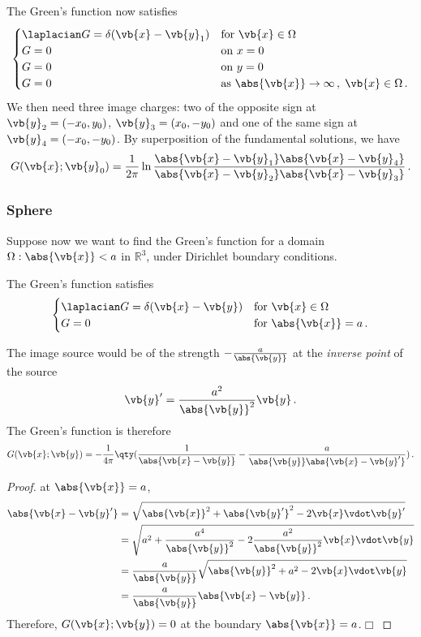 \documentclass{article}
\theoremstyle{plain}\theoremheaderfont{\normalfont\itshape}\theorembodyfont{\rmfamily}\theoremseparator{.}\newtheorem*{rem}{Remark}\newtheorem*{ex}{Example}\newtheorem*{proof}{Proof}\newtheorem*{altp}{Alternative proof}
\theoremstyle{plain}\theoremheaderfont{\normalfont\bfseries}\theorembodyfont{\rmfamily}\theoremseparator{.}\newtheorem{thm}{Theorem}[section]\newtheorem{lem}[thm]{Lemma}\newtheorem{prop}[thm]{Proposition}\newtheorem*{cor}{Corollary}\newtheorem{defn}[thm]{Definition}\newtheorem{clm}[thm]{Claim}\newtheorem{clminproof}{Claim}
\theoremstyle{break}\theoremheaderfont{\normalfont\itshape}\theorembodyfont{\rmfamily}\theoremseparator{.\medskip}\newtheorem*{proofskip}{Proof}\newtheorem*{exs}{Examples}\newtheorem*{rems}{Remarks}
\theoremstyle{break}\theoremheaderfont{\normalfont\bfseries}\theorembodyfont{\rmfamily}\theoremseparator{.\medskip}\newtheorem{lemskip}[thm]{Lemma}\newtheorem{defnskip}[thm]{Definition}\newtheorem{propskip}[thm]{Proposition}\newtheorem{thmskip}[thm]{Theorem}
\numberwithin{equation}{section}
\newcommand{\qed}{\hfill\ensuremath{\Box}}
\begin{document}
	The Green's function now satisfies
	\[\begin{cases}
		\laplacian G=\delta(\vb{x}-\vb{y}_1) & \text{for }\vb{x}\in\Omega\\
		G=0 & \text{on }x=0\\
		G=0 & \text{on }y=0\\
		G=0 & \text{as }\abs{\vb{x}}\to\infty\,,\;\vb{x}\in\Omega\,.
	\end{cases}\]
	We then need three image charges: two of the opposite sign at \(\vb{y}_2=(-x_0,y_0)\), \(\vb{y}_3=(x_0,-y_0)\) and one of the same sign at \(\vb{y}_4=(-x_0,-y_0)\).
	By superposition of the fundamental solutions, we have
	\[G(\vb{x};\vb{y}_0)=\frac{1}{2\pi}\ln\frac{\abs{\vb{x}-\vb{y}_1}\abs{\vb{x}-\vb{y}_4}}{\abs{\vb{x}-\vb{y}_2}\abs{\vb{x}-\vb{y}_3}}\,.\]

	\subsubsection{Sphere}
	Suppose now we want to find the Green's function for a domain \(\Omega:\abs{\vb{x}}<a\) in \(\mathbb{R}^3\), under Dirichlet boundary conditions.

	The Green's function satisfies
	\[\begin{cases}
		\laplacian G=\delta(\vb{x}-\vb{y}) & \text{for }\vb{x}\in\Omega\\
		G=0 & \text{for }\abs{\vb{x}}=a\,.
	\end{cases}\]

	The image source would be of the strength \(-\frac{a}{\abs{\vb{y}}}\) at the \textit{inverse point} of the source
	\[\vb{y}'=\frac{a^2}{\abs{\vb{y}}^2}\vb{y}\,.\]
	The Green's function is therefore
	\[G(\vb{x};\vb{y})=-\frac{1}{4\pi}\qty(\frac{1}{\abs{\vb{x}-\vb{y}}}-\frac{a}{\abs{\vb{y}}\abs{\vb{x}-\vb{y}'}})\,.\]

	\begin{proof}
		at \(\abs{\vb{x}}=a\),
		\begin{align*}
			\abs{\vb{x}-\vb{y}'}&=\sqrt{\abs{\vb{x}}^2+\abs{\vb{y}'}^2-2\vb{x}\vdot\vb{y}'}\\
			&=\sqrt{a^2+\frac{a^4}{\abs{\vb{y}}^2}-2\frac{a^2}{\abs{\vb{y}}^2}\vb{x}\vdot\vb{y}}\\
			&=\frac{a}{\abs{\vb{y}}}\sqrt{\abs{\vb{y}}^2+a^2-2\vb{x}\vdot\vb{y}}\\
			&=\frac{a}{\abs{\vb{y}}}\abs{\vb{x}-\vb{y}}\,.
		\end{align*}
		Therefore, \(G(\vb{x};\vb{y})=0\) at the boundary \(\abs{\vb{x}}=a\).\qed
	\end{proof}
\end{document}
